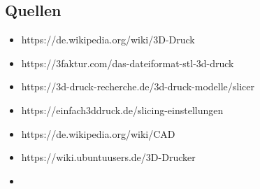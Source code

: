 \documentclass{article}
\begin{document}
	\subsection{Quellen}
	\begin{itemize}
		\item https://de.wikipedia.org/wiki/3D-Druck
		\item https://3faktur.com/das-dateiformat-stl-3d-druck
		\item https://3d-druck-recherche.de/3d-druck-modelle/slicer
		\item https://einfach3ddruck.de/slicing-einstellungen
		\item https://de.wikipedia.org/wiki/CAD
		\item https://wiki.ubuntuusers.de/3D-Drucker
		\item 
	\end{itemize}
\end{document}
